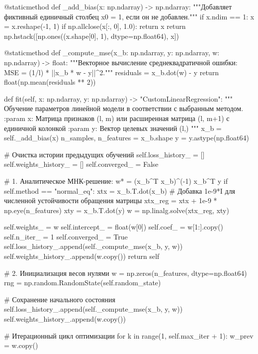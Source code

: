 \documentclass[14pt,a4paper]{extarticle}
\begin{document}
\begin{CodeListing}
    @staticmethod
    def _add_bias(x: np.ndarray) -> np.ndarray:
        """Добавляет фиктивный единичный столбец x0 = 1, если он не добавлен."""
        if x.ndim == 1:
            x = x.reshape(-1, 1)
        if np.allclose(x[:, 0], 1.0):
            return x
        return np.hstack([np.ones((x.shape[0], 1), dtype=np.float64), x])

    @staticmethod
    def _compute_mse(x_b: np.ndarray, y: np.ndarray, w: np.ndarray) -> float:
        """Векторное вычисление среднеквадратичной ошибки: MSE = (1/l) * ||x_b * w - y||^2."""
        residuals = x_b.dot(w) - y
        return float(np.mean(residuals ** 2))

    def fit(self, x: np.ndarray, y: np.ndarray) -> "CustomLinearRegression":
        """
        Обучение параметров линейной модели в соответствии с выбранным методом.
        :param x: Матрица признаков (l, m) или расширенная матрица (l, m+1) с единичной колонкой
        :param y: Вектор целевых значений (l,)
        """
        x_b = self._add_bias(x)
        n_samples, n_features = x_b.shape
        y = y.astype(np.float64)

        # Очистка истории предыдущих обучений
        self.loss_history_ = []
        self.weights_history_ = []
        self.converged_ = False

        # 1. Аналитическое МНК-решение: w* = (x_b^T x_b)^(-1) x_b^T y
        if self.method == "normal_eq":
            xtx = x_b.T.dot(x_b)
            # Добавка 1e-9*I для численной устойчивости обращения матрицы
            xtx_reg = xtx + 1e-9 * np.eye(n_features)
            xty = x_b.T.dot(y)
            w = np.linalg.solve(xtx_reg, xty)

            self.weights_ = w
            self.intercept_ = float(w[0])
            self.coef_ = w[1:].copy()
            self.n_iter_ = 1
            self.converged_ = True
            self.loss_history_.append(self._compute_mse(x_b, y, w))
            self.weights_history_.append(w.copy())
            return self

        # 2. Инициализация весов нулями
        w = np.zeros(n_features, dtype=np.float64)
        rng = np.random.RandomState(self.random_state)

        # Сохранение начального состояния
        self.loss_history_.append(self._compute_mse(x_b, y, w))
        self.weights_history_.append(w.copy())

        # Итерационный цикл оптимизации
        for k in range(1, self.max_iter + 1):
            w_prev = w.copy()


\end{CodeListing}
\end{document}
